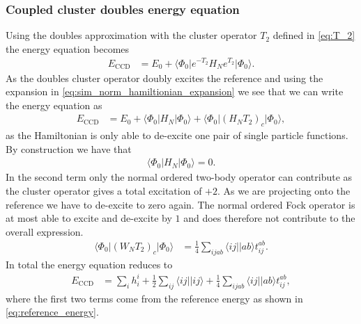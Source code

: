\documentclass[
    a4paper, aps, twocolumn, floatfix, superscriptaddress,
    nofootinbib]{revtex4-1}
\newcommand{\1}{\mathds{1}}
\newcommand{\half}{\frac{1}{2}}
\newcommand{\bra}[1]{\langle #1\lvert}
\newcommand{\ket}[1]{\rvert #1\rangle}
\newcommand{\kslat}{\ket{\Phi_0}}
\newcommand{\bslat}{\bra{\Phi_0}}
\newcommand{\eccd}{E_{\text{CCD}}}
\begin{document}
        \subsubsection{Coupled cluster doubles energy equation}
            Using the doubles approximation with the cluster operator $T_2$
            defined in \autoref{eq:T_2} the energy equation becomes
            \begin{align}
                \eccd
                &=
                E_0
                + \bslat e^{-T_2}H_N e^{T_2}\kslat.
            \end{align}
            As the doubles cluster operator doubly excites the reference and
            using the expansion in \autoref{eq:sim_norm_hamiltionian_expansion}
            we see that we can write the energy equation as
            \begin{align}
                \eccd
                &=
                E_0
                + \bslat H_N \kslat + \bslat (H_N T_2)_c\kslat,
            \end{align}
            as the Hamiltonian is only able to de-excite one pair of single
            particle functions. By construction we have that
            \begin{align}
                \bslat H_N \kslat = 0.
            \end{align}
            In the second term only the normal ordered two-body operator can
            contribute as the cluster operator gives a total excitation of $+2$.
            As we are projecting onto the reference we have to de-excite to zero
            again. The normal ordered Fock operator is at most able to excite
            and de-excite by $1$ and does therefore not contribute to the
            overall expression.
            \begin{align}
                \bslat (W_N T_2)_c \kslat
                &= \frac{1}{4}\sum_{ijab}\bra{ij}\ket{ab}t_{ij}^{ab}.
            \end{align}
            In total the energy equation reduces to
            \begin{align}
                \eccd
                &= \sum_{i} h_i^i + \half \sum_{ij}\bra{ij}\ket{ij}
                + \frac{1}{4}\sum_{ijab}\bra{ij}\ket{ab}t_{ij}^{ab},
            \end{align}
            where the first two terms come from the reference energy as shown in
            \autoref{eq:reference_energy}.
\end{document}
